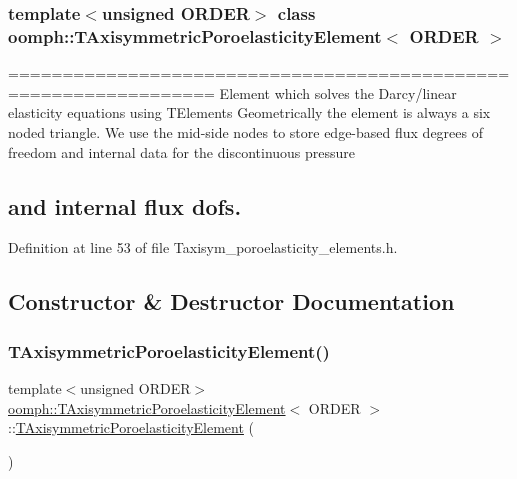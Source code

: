 \subsubsection*{template$<$unsigned O\+R\+D\+ER$>$\newline
class oomph\+::\+T\+Axisymmetric\+Poroelasticity\+Element$<$ O\+R\+D\+E\+R $>$}

================================================================= Element which solves the Darcy/linear elasticity equations using T\+Elements Geometrically the element is always a six noded triangle. We use the mid-\/side nodes to store edge-\/based flux degrees of freedom and internal data for the discontinuous pressure \subsection*{and internal flux dofs. }

Definition at line 53 of file Taxisym\+\_\+poroelasticity\+\_\+elements.\+h.



\subsection{Constructor \& Destructor Documentation}
\mbox{\label{classoomph_1_1TAxisymmetricPoroelasticityElement_aa05de51d7ccb8f104cb1015936e52754}} 
\subsubsection{\texorpdfstring{T\+Axisymmetric\+Poroelasticity\+Element()}{TAxisymmetricPoroelasticityElement()}\hspace{0.1cm}{\footnotesize\ttfamily [1/3]}}
{\footnotesize\ttfamily template$<$unsigned O\+R\+D\+ER$>$ \\
\hyperlink{classoomph_1_1TAxisymmetricPoroelasticityElement}{oomph\+::\+T\+Axisymmetric\+Poroelasticity\+Element}$<$ O\+R\+D\+ER $>$\+::\hyperlink{classoomph_1_1TAxisymmetricPoroelasticityElement}{T\+Axisymmetric\+Poroelasticity\+Element} (\begin{DoxyParamCaption}{ }\end{DoxyParamCaption})}




